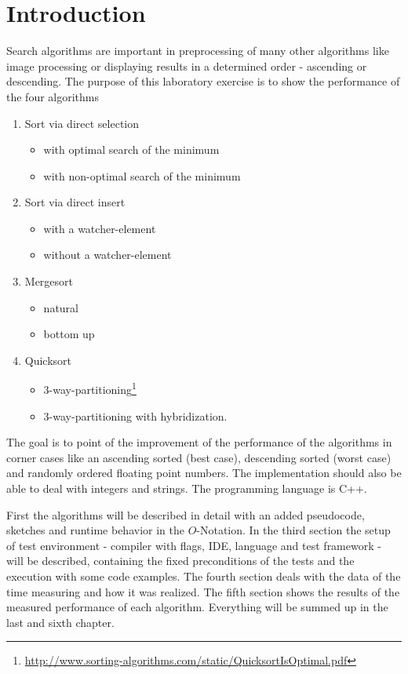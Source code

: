 \documentclass[11pt]{amsart}
\begin{document}
\section{Introduction}
Search algorithms are important in preprocessing of many other algorithms like image processing or displaying results in a determined order - ascending or descending.
The purpose of this laboratory exercise is to show the performance of the four algorithms 
\begin{enumerate}
	\item Sort via direct selection
		\begin{itemize}
			\item with optimal search of the minimum
			\item with non-optimal search of the minimum
		\end{itemize}
	\item Sort via direct insert
		\begin{itemize}
			\item with a watcher-element
			\item without a watcher-element
		\end{itemize}
	\item Mergesort
		\begin{itemize}
			\item natural
			\item bottom up
		\end{itemize}
	\item Quicksort
		\begin{itemize}
			\item 3-way-partitioning\footnote{\url{http://www.sorting-algorithms.com/static/QuicksortIsOptimal.pdf}}
			\item 3-way-partitioning with hybridization.
		\end{itemize}
\end{enumerate}
The goal is to point of the improvement of the performance of the algorithms in corner cases like an ascending sorted (best case), descending sorted (worst case) and randomly ordered floating point numbers. The implementation should also be able to deal with integers and strings. The programming language is C++.

First the algorithms will be described in detail with an added pseudocode, sketches and runtime behavior in the $O$-Notation. In the third section the setup of test environment - compiler with flags, IDE, language and test framework - will be described, containing the fixed preconditions of the tests and the execution with some code examples. The fourth section deals with the data of the time measuring and how it was realized. The fifth section shows the results of the measured performance of each algorithm. Everything will be summed up in the last and sixth chapter. 
\end{document}
